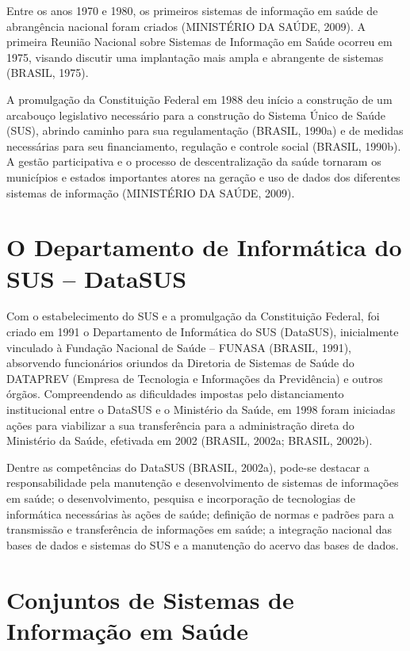 \documentclass[
  letterpaper,
  DIV=11,
  numbers=noendperiod]{scrreprt}
\begin{document}
Entre os anos 1970 e 1980, os primeiros sistemas de informação em saúde
de abrangência nacional foram criados (MINISTÉRIO DA SAÚDE, 2009). A
primeira Reunião Nacional sobre Sistemas de Informação em Saúde ocorreu
em 1975, visando discutir uma implantação mais ampla e abrangente de
sistemas (BRASIL, 1975).

A promulgação da Constituição Federal em 1988 deu início a construção de
um arcabouço legislativo necessário para a construção do Sistema Único
de Saúde (SUS), abrindo caminho para sua regulamentação (BRASIL, 1990a)
e de medidas necessárias para seu financiamento, regulação e controle
social (BRASIL, 1990b). A gestão participativa e o processo de
descentralização da saúde tornaram os municípios e estados importantes
atores na geração e uso de dados dos diferentes sistemas de informação
(MINISTÉRIO DA SAÚDE, 2009).

\section{O Departamento de Informática do SUS --
DataSUS}\label{o-departamento-de-informuxe1tica-do-sus-datasus}

Com o estabelecimento do SUS e a promulgação da Constituição Federal,
foi criado em 1991 o Departamento de Informática do SUS (DataSUS),
inicialmente vinculado à Fundação Nacional de Saúde -- FUNASA (BRASIL,
1991), absorvendo funcionários oriundos da Diretoria de Sistemas de
Saúde do DATAPREV (Empresa de Tecnologia e Informações da Previdência) e
outros órgãos. Compreendendo as dificuldades impostas pelo
distanciamento institucional entre o DataSUS e o Ministério da Saúde, em
1998 foram iniciadas ações para viabilizar a sua transferência para a
administração direta do Ministério da Saúde, efetivada em 2002 (BRASIL,
2002a; BRASIL, 2002b).

Dentre as competências do DataSUS (BRASIL, 2002a), pode-se destacar a
responsabilidade pela manutenção e desenvolvimento de sistemas de
informações em saúde; o desenvolvimento, pesquisa e incorporação de
tecnologias de informática necessárias às ações de saúde; definição de
normas e padrões para a transmissão e transferência de informações em
saúde; a integração nacional das bases de dados e sistemas do SUS e a
manutenção do acervo das bases de dados.

\section{Conjuntos de Sistemas de Informação em
Saúde}\label{conjuntos-de-sistemas-de-informauxe7uxe3o-em-sauxfade}
\end{document}
